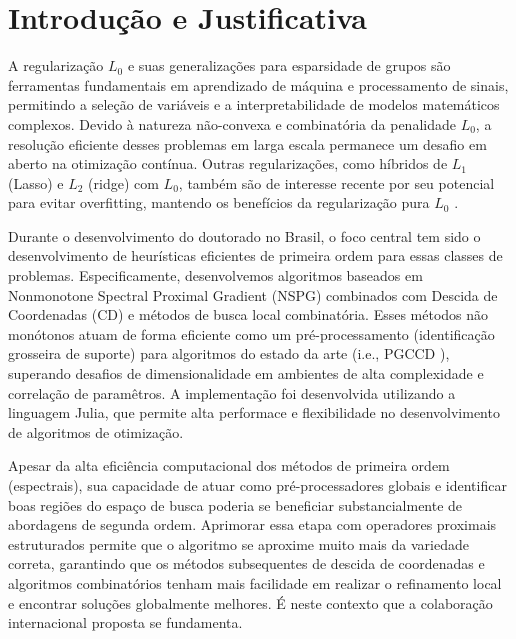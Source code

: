 \section{Introdução e Justificativa}

A regularização $L_0$ e suas generalizações para esparsidade de grupos são ferramentas fundamentais em aprendizado de máquina e processamento de sinais, permitindo a seleção de variáveis e a interpretabilidade de modelos matemáticos complexos. Devido à natureza não-convexa e combinatória da penalidade $L_0$, a resolução eficiente desses problemas em larga escala permanece um desafio em aberto na otimização contínua. Outras regularizações, como híbridos de $L_1$ (Lasso) e $L_2$ (ridge) com $L_0$, também são de interesse recente por seu potencial para evitar overfitting, mantendo os benefícios da regularização pura $L_0$ \cite{fastselect}.

Durante o desenvolvimento do doutorado no Brasil, o foco central tem sido o desenvolvimento de heurísticas eficientes de primeira ordem para essas classes de problemas. Especificamente, desenvolvemos algoritmos baseados em Nonmonotone Spectral Proximal Gradient (NSPG) combinados com Descida de Coordenadas (CD) e métodos de busca local combinatória. Esses métodos não monótonos atuam de forma eficiente como um pré-processamento (identificação grosseira de suporte) para algoritmos do estado da arte (i.e., PGCCD \cite{fastselect}), superando desafios de dimensionalidade em ambientes de alta complexidade e correlação de paramêtros. A implementação foi desenvolvida utilizando a linguagem Julia, que permite alta performace e flexibilidade no desenvolvimento de algoritmos de otimização.

Apesar da alta eficiência computacional dos métodos de primeira ordem (espectrais), sua capacidade de atuar como pré-processadores globais e identificar boas regiões do espaço de busca poderia se beneficiar substancialmente de abordagens de segunda ordem. Aprimorar essa etapa com operadores proximais estruturados permite que o algoritmo se aproxime muito mais da variedade correta, garantindo que os métodos subsequentes de descida de coordenadas e algoritmos combinatórios tenham mais facilidade em realizar o refinamento local e encontrar soluções globalmente melhores. É neste contexto que a colaboração internacional proposta se fundamenta.

